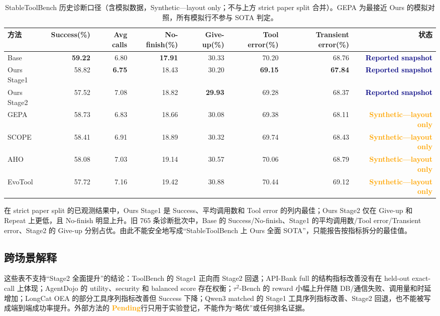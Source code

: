 \documentclass[a4paper,11pt]{article}
\newcommand{\reported}{\textcolor{navy}{\textbf{Reported snapshot}}}
\newcommand{\pending}{\textcolor{orange}{\textbf{Pending}}}
\newcommand{\layoutonly}{\textcolor{orange}{\textbf{Synthetic---layout only}}}
\begin{document}
\begin{CJK*}{UTF8}{gbsn}
\begin{table}[H]
\centering\scriptsize
\caption{StableToolBench 历史诊断口径（含模拟数据，Synthetic---layout only；不与上方 strict paper split 合并）。GEPA 为最接近 Ours 的模拟对照，所有模拟行不参与 SOTA 判定。}
\begin{adjustbox}{max width=\textwidth}
\begin{tabular}{lrrrrrrr}
\toprule
方法 & Success(\%) & Avg calls & No-finish(\%) & Give-up(\%) & Tool error(\%) & Transient error(\%) & 状态\\
\midrule
Base & \textbf{59.22} & 6.80 & \textbf{17.91} & 30.33 & 70.20 & 68.76 & \reported\\
Ours Stage1 & 58.82 & \textbf{6.75} & 18.43 & 30.20 & \textbf{69.15} & \textbf{67.84} & \reported\\
Ours Stage2 & 57.52 & 7.08 & 18.82 & \textbf{29.93} & 69.28 & 68.37 & \reported\\
GEPA & 58.73 & 6.83 & 18.66 & 30.08 & 69.38 & 68.11 & \layoutonly\\
SCOPE & 58.41 & 6.91 & 18.89 & 30.32 & 69.74 & 68.43 & \layoutonly\\
AHO & 58.08 & 7.03 & 19.14 & 30.57 & 70.06 & 68.79 & \layoutonly\\
EvoTool & 57.72 & 7.16 & 19.42 & 30.88 & 70.44 & 69.12 & \layoutonly\\
\bottomrule
\end{tabular}
\end{adjustbox}
\end{table}

在 strict paper split 的已观测结果中，Ours Stage1 是 Success、平均调用数和 Tool error 的列内最佳；Ours Stage2 仅在 Give-up 和 Repeat 上更低，且 No-finish 明显上升。旧 765 条诊断批次中，Base 的 Success/No-finish、Stage1 的平均调用数/Tool error/Transient error、Stage2 的 Give-up 分别占优。由此不能安全地写成“StableToolBench 上 Ours 全面 SOTA”，只能报告按指标拆分的最佳值。

\subsection{跨场景解释}

这些表不支持“Stage2 全面提升”的结论：ToolBench 的 Stage1 正向而 Stage2 回退；API-Bank full 的结构指标改善没有在 held-out exact-call 上体现；AgentDojo 的 utility、security 和 balanced score 存在权衡；$\tau^2$-Bench 的 reward 小幅上升伴随 DB/通信失败、调用量和时延增加；LongCat OEA 的部分工具序列指标改善但 Success 下降；Qwen3 matched 的 Stage1 工具序列指标改善、Stage2 回退，也不能被写成端到端成功率提升。外部方法的 \pending 行只用于实验登记，不能作为“略优”或任何排名证据。


\end{CJK*}
\end{document}
